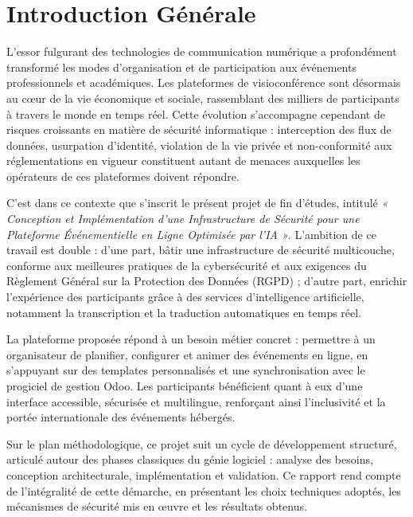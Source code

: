 \chapter*{Introduction Générale}

L'essor fulgurant des technologies de communication numérique a profondément transformé les modes d'organisation et de participation aux événements professionnels et académiques. Les plateformes de visioconférence sont désormais au c\oe{}ur de la vie économique et sociale, rassemblant des milliers de participants à travers le monde en temps réel. Cette évolution s'accompagne cependant de risques croissants en matière de sécurité informatique : interception des flux de données, usurpation d'identité, violation de la vie privée et non-conformité aux réglementations en vigueur constituent autant de menaces auxquelles les opérateurs de ces plateformes doivent répondre.

C'est dans ce contexte que s'inscrit le présent projet de fin d'études, intitulé \textit{« Conception et Implémentation d'une Infrastructure de Sécurité pour une Plateforme Événementielle en Ligne Optimisée par l'IA »}. L'ambition de ce travail est double : d'une part, bâtir une infrastructure de sécurité multicouche, conforme aux meilleures pratiques de la cybersécurité et aux exigences du Règlement Général sur la Protection des Données (RGPD) ; d'autre part, enrichir l'expérience des participants grâce à des services d'intelligence artificielle, notamment la transcription et la traduction automatiques en temps réel.

La plateforme proposée répond à un besoin métier concret : permettre à un organisateur de planifier, configurer et animer des événements en ligne, en s'appuyant sur des templates personnalisés et une synchronisation avec le progiciel de gestion Odoo. Les participants bénéficient quant à eux d'une interface accessible, sécurisée et multilingue, renforçant ainsi l'inclusivité et la portée internationale des événements hébergés.

Sur le plan méthodologique, ce projet suit un cycle de développement structuré, articulé autour des phases classiques du génie logiciel : analyse des besoins, conception architecturale, implémentation et validation. Ce rapport rend compte de l'intégralité de cette démarche, en présentant les choix techniques adoptés, les mécanismes de sécurité mis en \oe{}uvre et les résultats obtenus.

